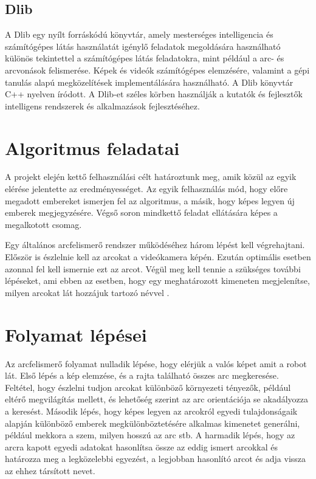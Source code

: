 \subsection{Dlib}
A Dlib\cite{dlib} egy nyílt forráskódú könyvtár, amely mesterséges intelligencia és számítógépes látás használatát igénylő feladatok megoldására használható különös tekintettel a számítógépes látás feladatokra, mint például a arc- és arcvonások felismerése. Képek és videók számítógépes elemzésére, valamint a gépi tanulás alapú megközelítések implementálására használható. A Dlib könyvtár C++ nyelven íródott. A Dlib-et széles körben használják a kutatók és fejlesztők intelligens rendszerek és alkalmazások fejlesztéséhez\cite{artc30}.

\section{Algoritmus feladatai}
A projekt elején kettő felhasználási célt határoztunk meg, amik közül az egyik elérése jelentette az eredményességet. Az egyik felhasználás mód, hogy előre megadott embereket ismerjen fel az algoritmus, a másik, hogy képes legyen új emberek megjegyzésére. Végső soron mindkettő feladat ellátására képes a megalkotott csomag.

Egy általános arcfelismerő rendszer működéséhez három lépést kell végrehajtani. Először is észlelnie kell az arcokat a videókamera képén. Ezután optimális esetben azonnal fel kell ismernie ezt az arcot. Végül meg kell tennie a szükséges további lépéseket, ami ebben az esetben, hogy egy meghatározott kimeneten megjelenítse, milyen arcokat lát hozzájuk tartozó névvel \cite{artc32}.

 \clearpage

\section{Folyamat lépései}
Az arcfelismerő folyamat nulladik lépése, hogy elérjük a valós képet amit a robot lát.
Első lépés a kép elemzése, és a rajta található összes arc megkeresése. Feltétel, hogy észlelni tudjon arcokat különböző környezeti tényezők, például eltérő megvilágítás mellett, és lehetőség szerint az arc orientációja se akadályozza a keresést.
Második lépés, hogy képes legyen az arcokról egyedi tulajdonságaik alapján különböző emberek megkülönböztetésére alkalmas kimenetet generálni, például mekkora a szem, milyen hosszú az arc stb.
A harmadik lépés, hogy az arcra kapott egyedi adatokat hasonlítsa össze az eddig ismert arcokkal és határozza meg a legközelebbi egyezést, a legjobban hasonlító arcot és adja vissza az ehhez társított nevet.

